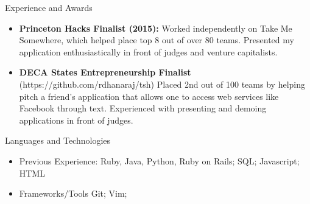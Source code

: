 \documentclass[]{mcdowellcv}
\begin{document}
	\begin{cvsection}{Experience and Awards}
		\begin{cvsubsection}{}{}{}	
			\begin{itemize}
				\item \textbf{Princeton Hacks Finalist (2015):} Worked independently on Take Me Somewhere, which helped place top 8 out of over 80 teams. Presented my application enthusiastically in front of judges and venture capitalists.
				\item \textbf{DECA States Entrepreneurship Finalist} (https://github.com/rdhanaraj/tsh) Placed 2nd out of 100 teams by helping pitch a friend's application that allows one to access web services like Facebook through text. Experienced with presenting and demoing applications in front of judges.
			\end{itemize}
		\end{cvsubsection}
	\end{cvsection}
	
	\begin{cvsection}{Languages and Technologies}
		\begin{cvsubsection}{}{}{}	
			\begin{itemize}
				\item Previous Experience: Ruby, Java, Python, Ruby on Rails; SQL; Javascript; HTML
				\item Frameworks/Tools Git; Vim;
			\end{itemize}
		\end{cvsubsection}
	\end{cvsection}
	
\end{document}
